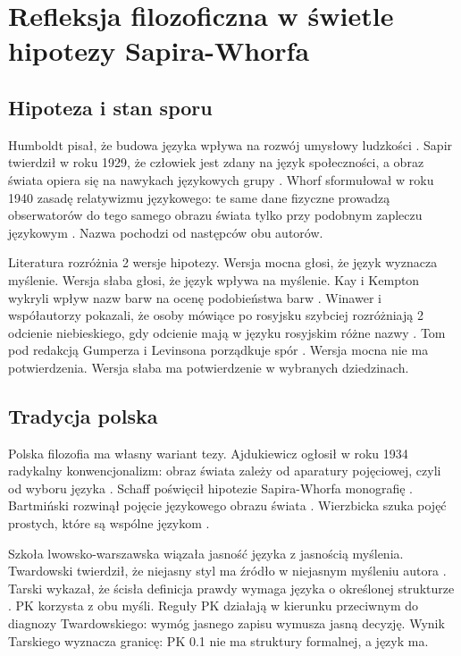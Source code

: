 \section{Refleksja filozoficzna w świetle hipotezy Sapira-Whorfa}
\label{sec:philosophy}

\subsection{Hipoteza i stan sporu}

Humboldt pisał, że budowa języka wpływa na rozwój umysłowy ludzkości \cite{humboldt1836}.
Sapir twierdził w roku 1929, że człowiek jest zdany na język społeczności, a obraz
świata opiera się na nawykach językowych grupy \cite{sapir1929}. Whorf sformułował w roku
1940 zasadę relatywizmu językowego: te same dane fizyczne prowadzą obserwatorów do tego
samego obrazu świata tylko przy podobnym zapleczu językowym \cite{whorf1940,whorf1956}.
Nazwa  pochodzi od następców obu autorów.

Literatura rozróżnia 2 wersje hipotezy. Wersja mocna głosi, że język wyznacza myślenie.
Wersja słaba głosi, że język wpływa na myślenie. Kay i Kempton wykryli wpływ nazw barw na
ocenę podobieństwa barw \cite{kay1984}. Winawer i współautorzy pokazali, że osoby
mówiące po rosyjsku szybciej rozróżniają 2 odcienie niebieskiego, gdy odcienie mają
w języku rosyjskim różne nazwy \cite{winawer2007}. Tom pod redakcją Gumperza i Levinsona
porządkuje spór \cite{gumperz1996}. Wersja mocna nie ma potwierdzenia. Wersja słaba ma
potwierdzenie w wybranych dziedzinach.

\subsection{Tradycja polska}

Polska filozofia ma własny wariant tezy. Ajdukiewicz ogłosił w roku 1934 radykalny
konwencjonalizm: obraz świata zależy od aparatury pojęciowej, czyli od wyboru języka
\cite{ajdukiewicz1934}. Schaff poświęcił hipotezie Sapira-Whorfa monografię
 \cite{schaff1964}. Bartmiński rozwinął pojęcie językowego obrazu
świata \cite{bartminski2006}. Wierzbicka szuka pojęć prostych, które są wspólne
językom \cite{wierzbicka1996}.

Szkoła lwowsko-warszawska wiązała jasność języka z jasnością myślenia. Twardowski
twierdził, że niejasny styl ma źródło w niejasnym myśleniu autora \cite{twardowski1919}.
Tarski wykazał, że ścisła definicja prawdy wymaga języka o określonej strukturze
\cite{tarski1933}. PK korzysta z obu myśli. Reguły PK działają w kierunku przeciwnym do
diagnozy Twardowskiego: wymóg jasnego zapisu wymusza jasną decyzję. Wynik Tarskiego
wyznacza granicę: PK 0.1 nie ma struktury formalnej, a język \PKz{} ma.

